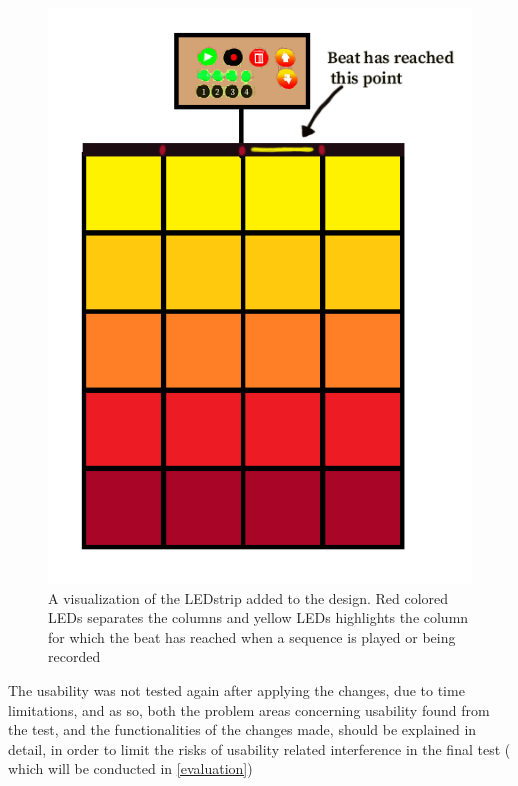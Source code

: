\begin{figure}[H]
	\centering
	\includegraphics[width=1\linewidth]{figure/Design/LEDstrip}
	\caption{A visualization of the LEDstrip added to the design. Red colored LEDs separates the columns and yellow LEDs highlights the column for which the beat has reached when a sequence is played or being recorded}
	\label{fig:LEDstrip}
\end{figure}

The usability was not tested again after applying the changes, due to time limitations, and as so, both the problem areas concerning usability found from the test, and the functionalities of the changes made, should be explained in detail, in order to limit the risks of usability related interference in the final test ( which will be conducted in \autoref{evaluation})
